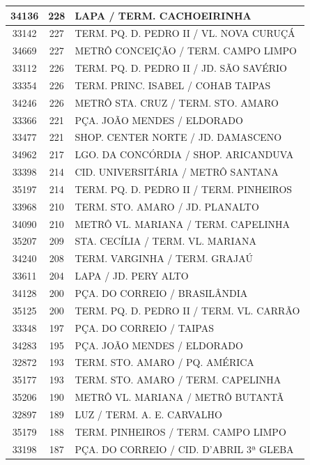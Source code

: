 \documentclass[
	12pt,				%
	oneside,			%
	a4paper,			%
	english,			%
	brazil				%
	]{abntex2ppgsi}
\begin{document}
\begin{apendicesenv}
\begin{longtable}{c|c|p{7cm}}
\hline
    34136 & 228   & LAPA / TERM. CACHOEIRINHA \\
\hline
    33142 & 227   & TERM. PQ. D. PEDRO II / VL. NOVA CURUÇÁ \\
\hline
    34669 & 227   & METRÔ CONCEIÇÃO / TERM. CAMPO LIMPO \\
\hline
    33112 & 226   & TERM. PQ. D. PEDRO II / JD. SÃO SAVÉRIO \\
\hline
    33354 & 226   & TERM. PRINC. ISABEL / COHAB TAIPAS \\
\hline
    34246 & 226   & METRÔ STA. CRUZ / TERM. STO. AMARO \\
\hline
    33366 & 221   & PÇA. JOÃO MENDES / ELDORADO \\
\hline
    33477 & 221   & SHOP. CENTER NORTE / JD. DAMASCENO \\
\hline
    34962 & 217   & LGO. DA CONCÓRDIA / SHOP. ARICANDUVA \\
\hline
    33398 & 214   & CID. UNIVERSITÁRIA / METRÔ SANTANA \\
\hline
    35197 & 214   & TERM. PQ. D. PEDRO II / TERM. PINHEIROS \\
\hline
    33968 & 210   & TERM. STO. AMARO / JD. PLANALTO \\
\hline
    34090 & 210   & METRÔ VL. MARIANA / TERM. CAPELINHA \\
\hline
    35207 & 209   & STA. CECÍLIA / TERM. VL. MARIANA \\
\hline
    34240 & 208   & TERM. VARGINHA / TERM. GRAJAÚ \\
\hline
    33611 & 204   & LAPA / JD. PERY ALTO \\
\hline
    34128 & 200   & PÇA. DO CORREIO / BRASILÂNDIA \\
\hline
    35125 & 200   & TERM. PQ. D. PEDRO II / TERM. VL. CARRÃO \\
\hline
    33348 & 197   & PÇA. DO CORREIO / TAIPAS \\
\hline
    34283 & 195   & PÇA. JOÃO MENDES / ELDORADO \\
\hline
    32872 & 193   & TERM. STO. AMARO / PQ. AMÉRICA \\
\hline
    35177 & 193   & TERM. STO. AMARO / TERM. CAPELINHA \\
\hline
    35206 & 190   & METRÔ VL. MARIANA / METRÔ BUTANTÃ \\
\hline
    32897 & 189   & LUZ / TERM. A. E. CARVALHO \\
\hline
    35179 & 188   & TERM. PINHEIROS / TERM. CAMPO LIMPO \\
\hline
    33198 & 187   & PÇA. DO CORREIO / CID. D'ABRIL 3ª GLEBA \\

\end{longtable}
\end{apendicesenv}
\end{document}

